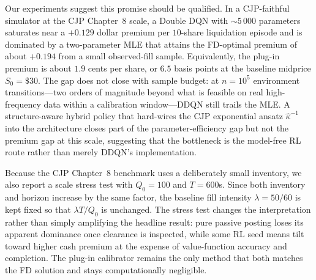 \documentclass[]{interact}
\theoremstyle{plain}
\theoremstyle{definition}
\theoremstyle{remark}
\newcommand{\1}[1]{\mathbf{1}_{\{#1\}}}
\begin{document}
Our experiments suggest this promise should be qualified. In a CJP-faithful simulator at the CJP Chapter~8 scale, a Double DQN with $\sim 5\,000$ parameters saturates near a $+0.129$ dollar premium per $10$-share liquidation episode and is dominated by a two-parameter MLE that attains the FD-optimal premium of about $+0.194$ from a small observed-fill sample. Equivalently, the plug-in premium is about $1.9$ cents per share, or $6.5$ basis points at the baseline midprice $S_0=\$30$. The gap does not close with sample budget: at $n = 10^5$ environment transitions---two orders of magnitude beyond what is feasible on real high-frequency data within a calibration window---DDQN still trails the MLE. A structure-aware hybrid policy that hard-wires the CJP exponential ansatz $\hat\kappa^{-1}$ into the architecture closes part of the parameter-efficiency gap but not the premium gap at this scale, suggesting that the bottleneck is the model-free RL route rather than merely DDQN's implementation.

Because the CJP Chapter~8 benchmark uses a deliberately small inventory, we also report a scale stress test with $Q_0=100$ and $T=600$s. Since both inventory and horizon increase by the same factor, the baseline fill intensity $\lambda=50/60$ is kept fixed so that $\lambda T/Q_0$ is unchanged. The stress test changes the interpretation rather than simply amplifying the headline result: pure passive posting loses its apparent dominance once clearance is inspected, while some RL seed means tilt toward higher cash premium at the expense of value-function accuracy and completion. The plug-in calibrator remains the only method that both matches the FD solution and stays computationally negligible.
\end{document}
